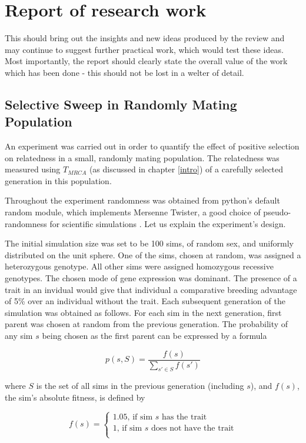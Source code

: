 \documentclass{l4proj}
\begin{document}

\chapter{Report of research work}\label{research}
This should bring out the insights and new ideas produced by the review and may continue to suggest further practical work, which would test these ideas. Most importantly, the report should clearly state the overall value of the work which has been done - this should not be lost in a welter of detail.

\section{Selective Sweep in Randomly Mating Population}

An experiment was carried out in order to quantify the effect of positive selection on relatedness in a small, randomly mating population. The relatedness was measured using $T_{MRCA}$ (as discussed in chapter \ref{intro}) of a carefully selected generation in this population.

Throughout the experiment randomness was obtained from python's default random module, which implements Mersenne Twister, a good choice of pseudo-randomness for scientific simulations \parencite{Matsumoto98}. Let us explain the experiment's design.

The initial simulation size was set to be 100 sims, of random sex, and uniformly distributed on the unit sphere. One of the sims, chosen at random, was assigned a \gls{heterozygous} genotype. All other sims were assigned \gls{homozygous} recessive genotypes. The chosen mode of gene expression was \gls{dominant}. The presence of a trait in an invidual would give that individual a comparative breeding advantage of 5\% over an individual without the trait. Each subsequent generation of the simulation was obtained as follows. For each sim in the next generation, first parent was chosen at random from the previous generation. The probability of any sim $s$ being chosen as the first parent can be expressed by a formula

$$p(s, S) = \frac{f(s)}{\sum_{s' \in S}^{}f(s')}$$

where $S$ is the set of all sims in the previous generation (including $s$), and $f(s)$, the sim's absolute fitness, is defined by

$$
f(s) = \begin{cases}
  1.05 \text{, if sim $s$ has the trait} \\
  1 \text{, if sim $s$ does not have the trait} \\
\end{cases}
$$
\end{document}
